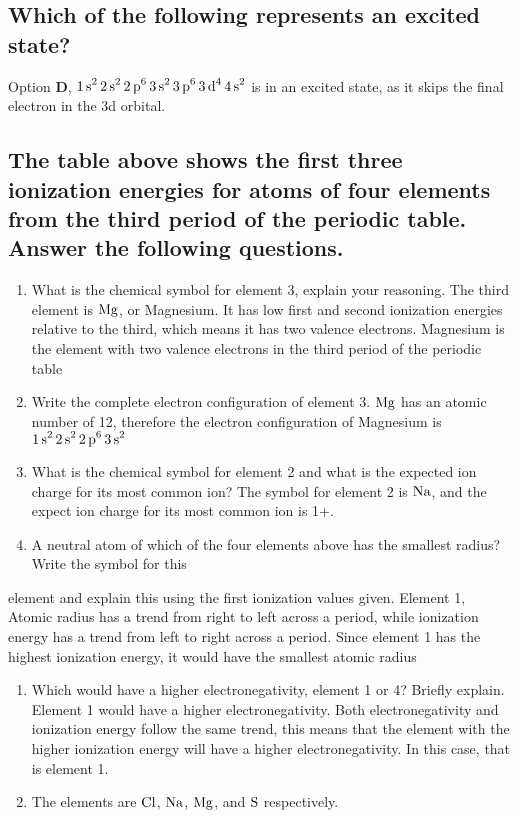 \documentclass[11pt]{article}
\begin{document}
\subsection{Which of the following represents an excited state?}
\label{sec:org6456eeb}
Option \textbf{D}, \(\ce{1s^2 2s^2 2p^6 3s^2 3p^6 3d^4 4s^2}\) is in an excited state, as it skips the final electron in the 3d orbital.

\subsection{The table above shows the first three ionization energies for atoms of four elements from the third period of the periodic table. Answer the following questions.}
\label{sec:org784a402}
\begin{enumerate}
\item What is the chemical symbol for element 3, explain your reasoning.
The third element is \(\ce{Mg}\), or Magnesium. It has low first and second ionization energies relative to the third, which means it has two valence electrons. Magnesium is the element with two valence electrons in the third period of the periodic table

\item Write the complete electron configuration of element 3.
\(\ce{Mg}\) has an atomic number of 12, therefore the electron configuration of Magnesium is \(\ce{1s^2 2s^2 2p^6 3s^2}\)

\item What is the chemical symbol for element 2 and what is the expected ion charge for its most common ion?
The symbol for element 2 is \(\ce{Na}\), and the expect ion charge for its most common ion is 1+.

\item A neutral atom of which of the four elements above has the smallest radius? Write the symbol for this
\end{enumerate}
element and explain this using the first ionization values given.
   Element 1, Atomic radius has a trend from right to left across a period, while ionization energy has a trend from left to right across a period. Since element 1 has the highest ionization energy, it would have the smallest atomic radius

\begin{enumerate}
\item Which would have a higher electronegativity, element 1 or 4? Briefly explain.
Element 1 would have a higher electronegativity. Both electronegativity and ionization energy follow the same trend, this means that the element with the higher ionization energy will have a higher electronegativity. In this case, that is element 1.

\item The elements are \(\ce{Cl}\), \(\ce{Na}\), \(\ce{Mg}\), and \(\ce{S}\) respectively.
\end{enumerate}
\end{document}
